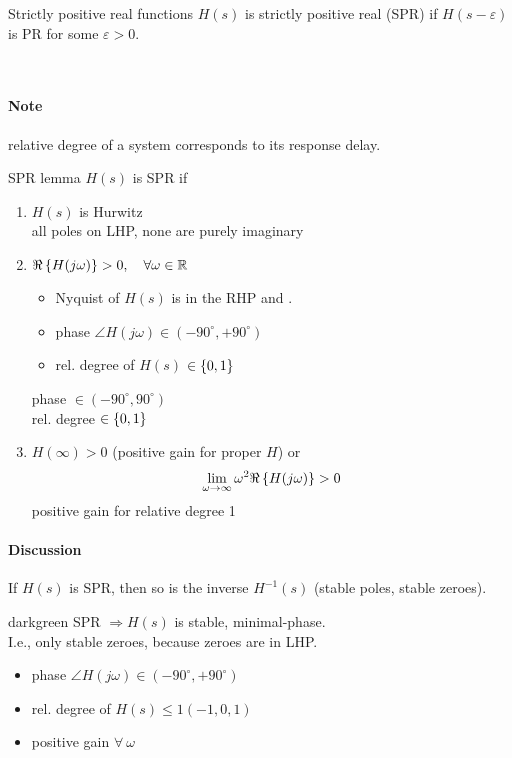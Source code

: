 \begin{definition}{Strictly positive real functions}
$H(s)$ is strictly positive real (SPR) if $H(s - \varepsilon)$ 
is PR for some $\varepsilon > 0$.
\end{definition}~

\paragraph{Note} relative degree of a system corresponds to
its response delay.

\begin{lemma}{SPR lemma}
$H(s)$ is SPR if
\begin{enumerate}[label=(\roman*)]
    \item $H(s)$ is Hurwitz\\
        all poles on LHP, none are purely imaginary
    \item $\Re\left\{H(j\omega)\right\} > 0, \quad \forall \omega \in \mathbb{R}$
        \begin{itemize}
            \item Nyquist of $H(s)$ is in the RHP and .
            \item phase $\angle H(j\omega) \in (-90^{\circ}, +90^{\circ})$
            \item rel. degree of $H(s)$ $\in \left\lbrace 0,1 \right\rbrace$
        \end{itemize}
        phase $\in (-90 ^{\circ}, 90 ^{\circ})$\\
        rel. degree $\in \left\lbrace 0, 1 \right\rbrace$
    \item $H( \infty) > 0$ (positive gain for proper $H$) or 
        \begin{alignat*}{3}
        \lim_{\omega \rightarrow \infty} \omega^2 \Re\left\{H(j\omega)\right\} > 0
        \end{alignat*}
        positive gain for relative degree 1
\end{enumerate}
\end{lemma}

\paragraph{Discussion}
If $H(s)$ is SPR, then so is the inverse $H^{-1}(s)$
(stable poles, stable zeroes).\\

\begin{conclusion}{darkgreen}
    SPR  $\Rightarrow H(s)$ is stable, minimal-phase.\\
    I.e., only stable zeroes, because zeroes are in LHP.
    \begin{itemize}
        \item phase $\angle H(j\omega) \in (-90^{\circ}, +90^{\circ})$
        \item rel. degree of $H(s) \leq 1 (-1, 0, 1)$
        \item positive gain $\forall ~ \omega$
    \end{itemize}
\end{conclusion}~

